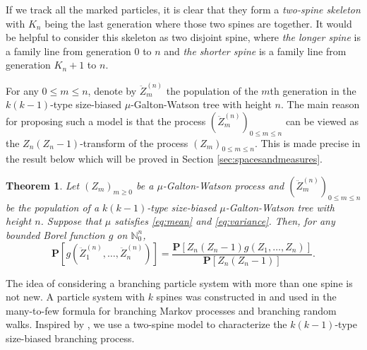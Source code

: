 \documentclass[12pt,a4paper]{amsart}
\newtheorem{thm}{Theorem}[section]
\numberwithin{equation}{section}
\begin{document}
	If we track all the marked particles, it is clear that they form a \emph{two-spine skeleton} with $K_n$ being the last generation where those two spines are together.
	It would be helpful to consider this skeleton as two disjoint spine, where \emph{the longer spine} is a family line from generation $0$ to $n$ and \emph{the shorter spine} is a family line from generation $K_n+1$ to $n$.
	
	For any $0\le m \le n$, denote by $\ddot Z_m^{(n)}$ the population of the $m$th generation in the $k(k-1)$-type size-biased $\mu$-Galton-Watson tree with height $n$.
	The main reason for proposing such a model is that the process $(\ddot Z_m^{(n)})_{0\le m\le n}$ can be viewed as the $Z_n(Z_n-1)$-transform of the process $(Z_m)_{0\le m\le n}$.
	This is made precise in the result below which will be proved in Section \ref{sec:spacesandmeasures}.
\begin{thm}
\label{thm: change of measure}
	Let $(Z_m)_{m\ge 0}$ be a $\mu$-Galton-Watson process and $(\ddot Z_m^{(n)})_{0\le m\le n}$ be the population of a $k(k-1)$-type size-biased $\mu$-Galton-Watson tree with height $n$.
	Suppose that $\mu$ satisfies \eqref{eq:mean} and \eqref{eq:variance}.
	Then, for any bounded Borel function $g$ on $\mathbb N^{n}_0$,
\begin{equation*}
		\mathbf P[ g ( \ddot Z_1^{(n)}, \dots, \ddot Z_n^{(n)})]
	=
		\frac{ \mathbf P[ Z_n(Z_n-1) g( Z_1, \dots, Z_n)]} {\mathbf P [ Z_n ( Z_n - 1)]}.			
\end{equation*}
\end{thm}

	The idea of considering a branching particle system with more than one spine is not new.
	A particle system with $k$ spines  was constructed in \cite{harris2015many} and used in the  many-to-few formula for branching Markov processes and branching random walks. 
	Inspired by \cite{harris2015many}, we use a two-spine model to characterize the $k(k-1)$-type size-biased branching process.
\end{document}

